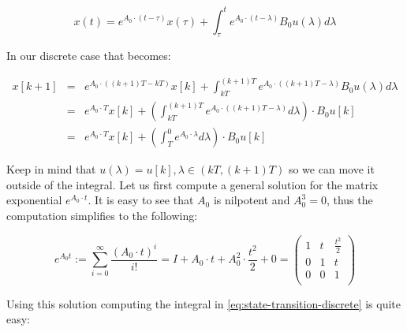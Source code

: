 \documentclass[english,ngerman]{KITreprt}
\begin{document}
\begin{equation}
x(t) = e^{A_0 \cdot (t - \tau)} x(\tau) + \int^t_\tau e^{A_0 \cdot (t - \lambda)} B_0 u(\lambda) d\lambda
\end{equation}

In our discrete case that becomes:

\begin{eqnarray} \label{eq:state-transition-discrete}
x[k+1] & = & e^{A_0 \cdot ((k+1)T - kT)} x[k] + \int^{(k+1)T}_{kT} e^{A_0 \cdot ((k+1)T - \lambda)} B_0 u(\lambda) d\lambda \\
       & = & e^{A_0 \cdot T} x[k] + \left(\int^{(k+1)T}_{kT} e^{A_0 \cdot ((k+1)T - \lambda)} d\lambda \right) \cdot B_0 u[k]\\
       & = & e^{A_0 \cdot T} x[k] + \left(\int^{0}_{T} e^{A_0 \cdot \lambda} d\lambda\right) \cdot B_0 u[k]
\end{eqnarray}

Keep in mind that $u(\lambda) = u[k], \lambda \in (kT, (k+1)T)$ so we
can move it outside of the integral. Let us first compute a general
solution for the matrix exponential $e^{A_0 \cdot t}$. It is easy to see
that $A_0$ is nilpotent and $A_0^3 = 0$, thus the computation simplifies
to the following:

\begin{equation}
e^{A_0 t} := \sum^{\infty}_{i=0} \frac{(A_0 \cdot t)^i}{i!} = I + A_0 \cdot t + A_0^2 \cdot \frac{t^2}{2} + 0
=
\left(\begin{array}{ccc}
1 & t & \frac{t^2}{2}\\
0 & 1 & t \\
0 & 0 & 1 \\
\end{array}\right)
\end{equation}

Using this solution computing the integral in
\ref{eq:state-transition-discrete} is quite easy:
\end{document}
